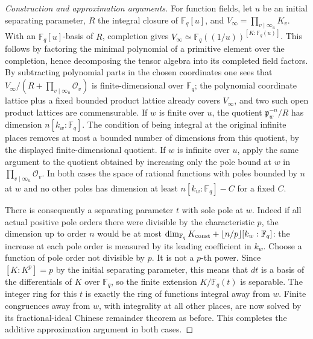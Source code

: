 \documentclass[11pt,a4paper,openany,oneside]{book}
\theoremstyle{resultstyle}
\theoremstyle{definition}
\numberwithin{equation}{chapter}
\newcommand{\OO}{\mathcal{O}}
\newcommand{\FF}{\mathbb{F}}
\begin{document}
\begin{proof}[Construction and approximation arguments]
For function fields, let $u$ be an initial separating
parameter, $R$ the integral closure of $\FF_q[u]$, and
$V_\infty=\prod_{v\mid\infty_u}K_v$. With an
$\FF_q[u]$-basis of $R$, completion gives
$V_\infty\simeq\FF_q((1/u))^{[K:\FF_q(u)]}$.
This follows by factoring the minimal polynomial of
a primitive element over the completion, hence
decomposing the tensor algebra into its completed
field factors. By subtracting polynomial parts
in the chosen coordinates one sees that
$V_\infty/(R+\prod_{v\mid\infty_u}\OO_v)$
is finite-dimensional over $\FF_q$; the polynomial
coordinate lattice plus a fixed bounded product
lattice already covers $V_\infty$, and two such
open product lattices are commensurable.
If $w$ is finite over $u$, the quotient
$\mathfrak p_w^{-n}/R$ has dimension
$n[k_w:\FF_q]$. The condition of being integral
at the original infinite places removes at most
a bounded number of dimensions from this quotient,
by the displayed finite-dimensional quotient.
If $w$ is infinite over $u$, apply the same
argument to the quotient obtained by increasing
only the pole bound at $w$ in
$\prod_{v\mid\infty_u}\OO_v$. In both cases the
space of rational functions with poles bounded
by $n$ at $w$ and no other poles has dimension at
least $n[k_w:\FF_q]-C$ for a fixed $C$.

There is consequently a separating parameter
$t$ with sole pole at $w$. Indeed if all actual
positive pole orders there were divisible by
the characteristic $p$, the dimension up to order
$n$ would be at most $\dim_{\FF_q}K_{\rm const}
+\lfloor n/p\rfloor[k_w:\FF_q]$: the increase at
each pole order is measured by its leading
coefficient in $k_w$. Choose a function of pole
order not divisible by $p$. It is not a $p$-th
power. Since $[K:K^p]=p$ by the initial separating
parameter, this means that $dt$ is a basis of
the differentials of $K$ over $\FF_q$, so the finite
extension $K/\FF_q(t)$ is separable. The integer
ring for this $t$ is exactly the ring of functions
integral away from $w$. Finite congruences away
from $w$, with integrality at all other places,
are now solved by its fractional-ideal Chinese
remainder theorem as before. This completes the
additive approximation argument in both cases.


\end{proof}
\end{document}
